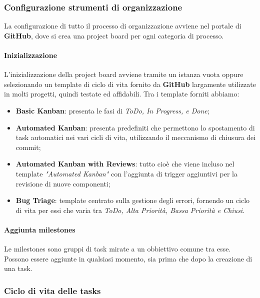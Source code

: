 \subsubsection{Configurazione strumenti di organizzazione}
	La configurazione di tutto il processo di organizzazione avviene nel portale di \textbf{GitHub}, dove si crea una project board per ogni categoria di processo. 	

\paragraph{Inizializzazione ~\\}
	L'inizializzazione della project board avviene tramite un istanza vuota oppure selezionando un template di ciclo di vita fornito da \textbf{GitHub} 
	largamente utilizzate in molti progetti, quindi testate ed affidabili. Tra i template forniti abbiamo: 

\begin{itemize}
		\item \textbf{Basic Kanban}: presenta le fasi di \textit{ToDo, In Progress, e Done}; 
		\item \textbf{Automated Kanban}: presenta  predefiniti che permettono lo spostamento di task automatici nei vari cicli di vita, utilizzando il meccanismo di chiusura 
		dei commit;
		\item \textbf{Automated Kanban with Reviews}: tutto cioè che viene incluso nel template \textit{"Automated Kanban"} con l'aggiunta di trigger 
		aggiuntivi per la revisione di nuove componenti; 
		\item \textbf{Bug Triage}: template centrato sulla gestione degli errori, fornendo un ciclo di vita per essi che varia tra \textit{ToDo, Alta Priorità, Bassa Priorità e Chiusi}. 
\end{itemize}
	  	
\paragraph{Aggiunta milestones ~\\}
	Le milestones sono gruppi di task mirate a un obbiettivo comune tra esse.
	Possono essere aggiunte in qualsiasi momento, sia prima che dopo la creazione di una task.

\subsubsection{Ciclo di vita delle tasks}

